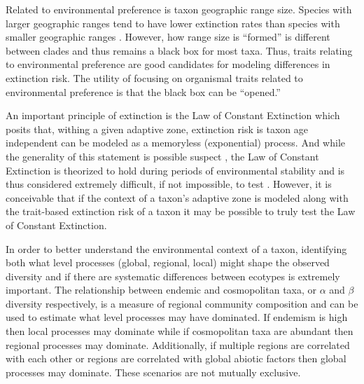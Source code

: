 \documentclass[12pt,letterpaper]{article}
\begin{document}
Related to environmental preference is taxon geographic range size. Species with larger geographic ranges tend to have lower extinction rates than species with smaller geographic ranges \citep{Jablonski1986,Harnik2013,Nurnberg2013a,Jablonski2003,Roy2009c}. However, how range size is ``formed'' is different between clades \citep{Jablonski1987} and thus remains a black box for most taxa. Thus, traits relating to environmental preference are good candidates for modeling differences in extinction risk. The utility of focusing on organismal traits related to environmental preference is that the black box can be ``opened.''

An important principle of extinction is the Law of Constant Extinction \citep{VanValen1973} which posits that, withing a given adaptive zone, extinction risk is taxon age independent can be modeled as a memoryless (exponential) process. And while the generality of this statement is possible suspect \citep{Drake2014,Raup1975,Sepkoski1975,Finnegan2008,Raup1991a}, the Law of Constant Extinction is theorized to hold during periods of environmental stability and is thus considered extremely difficult, if not impossible, to test \citep{Liow2011a}. However, it is conceivable that if the context of a taxon's adaptive zone is modeled along with the trait-based extinction risk of a taxon it may be possible to truly test the Law of Constant Extinction.

In order to better understand the environmental context of a taxon, identifying both what level processes (global, regional, local) might shape the observed diversity and if there are systematic differences between ecotypes is extremely important. The relationship between endemic and cosmopolitan taxa, or \(\alpha\) and \(\beta\) diversity respectively, is a measure of regional community composition and can be used to estimate what level processes may have dominated. If endemism is high then local processes may dominate while if cosmopolitan taxa are abundant then regional processes may dominate. Additionally, if multiple regions are correlated with each other or regions are correlated with global abiotic factors then global processes may dominate. These scenarios are not mutually exclusive. 
\end{document}
